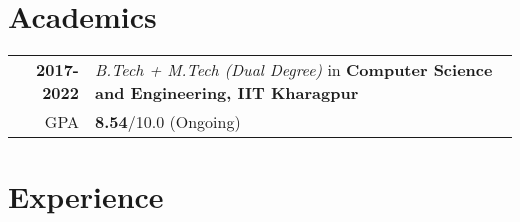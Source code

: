 \documentclass[a4paper,10pt]{extarticle} %
\begin{document}
\vspace{-0.4cm}
\section{\textcolor{primary}{Academics}}

\begin{tabular}{r|p{17.5cm}}	
\textbf{2017-2022} & \textit{B.Tech + M.Tech (Dual Degree)} in \textbf{Computer Science and Engineering, IIT Kharagpur}\\
\hfill GPA & \textbf{8.54}/10.0 (Ongoing)\\
\end{tabular}

\vspace{-0.3cm}
\section{\textcolor{primary}{Experience}}
\end{document}
